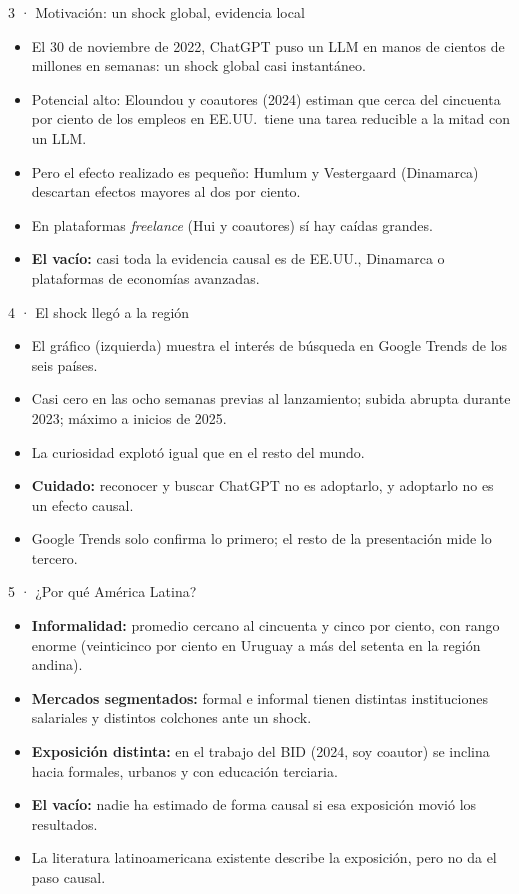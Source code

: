 \documentclass[11pt,aspectratio=169]{beamer}
\begin{document}
\begin{frame}{3 · Motivación: un shock global, evidencia local}
\begin{itemize}
  \item El 30 de noviembre de 2022, ChatGPT puso un LLM en manos de cientos de millones en semanas: un shock global casi instantáneo.
  \item Potencial alto: Eloundou y coautores (2024) estiman que cerca del cincuenta por ciento de los empleos en EE.UU.\ tiene una tarea reducible a la mitad con un LLM.
  \item Pero el efecto realizado es pequeño: Humlum y Vestergaard (Dinamarca) descartan efectos mayores al dos por ciento.
  \item En plataformas \emph{freelance} (Hui y coautores) sí hay caídas grandes.
  \item \textbf{El vacío:} casi toda la evidencia causal es de EE.UU., Dinamarca o plataformas de economías avanzadas.
\end{itemize}
\end{frame}

\begin{frame}{4 · El shock llegó a la región}
\begin{itemize}
  \item El gráfico (izquierda) muestra el interés de búsqueda en Google Trends de los seis países.
  \item Casi cero en las ocho semanas previas al lanzamiento; subida abrupta durante 2023; máximo a inicios de 2025.
  \item La curiosidad explotó igual que en el resto del mundo.
  \item \textbf{Cuidado:} reconocer y buscar ChatGPT no es adoptarlo, y adoptarlo no es un efecto causal.
  \item Google Trends solo confirma lo primero; el resto de la presentación mide lo tercero.
\end{itemize}
\end{frame}

\begin{frame}{5 · ¿Por qué América Latina?}
\begin{itemize}
  \item \textbf{Informalidad:} promedio cercano al cincuenta y cinco por ciento, con rango enorme (veinticinco por ciento en Uruguay a más del setenta en la región andina).
  \item \textbf{Mercados segmentados:} formal e informal tienen distintas instituciones salariales y distintos colchones ante un shock.
  \item \textbf{Exposición distinta:} en el trabajo del BID (2024, soy coautor) se inclina hacia formales, urbanos y con educación terciaria.
  \item \textbf{El vacío:} nadie ha estimado de forma causal si esa exposición movió los resultados.
  \item La literatura latinoamericana existente describe la exposición, pero no da el paso causal.
\end{itemize}
\end{frame}
\end{document}
